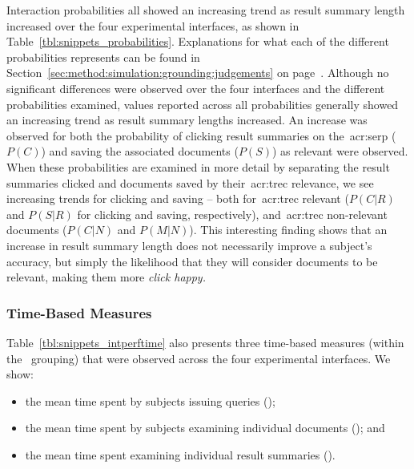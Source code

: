 Interaction probabilities all showed an increasing trend as result summary length increased over the four experimental interfaces, as shown in Table~\ref{tbl:snippets_probabilities}. Explanations for what each of the different probabilities represents can be found in Section~\ref{sec:method:simulation:grounding:judgements} on page~\pageref{sec:method:simulation:grounding:judgements}. Although no significant differences were observed over the four interfaces and the different probabilities examined, values reported across all probabilities generally showed an increasing trend as result summary lengths increased. An increase was observed for both the probability of clicking result summaries on the~\gls{acr:serp} ($P(C)$) and saving the associated documents ($P(S)$) as relevant were observed. When these probabilities are examined in more detail by separating the result summaries clicked and documents saved by their~\gls{acr:trec} relevance, we see increasing trends for clicking and saving -- both for~\gls{acr:trec} relevant ($P(C|R)$ and $P(S|R)$ for clicking and saving, respectively), and~\gls{acr:trec} non-relevant documents ($P(C|N)$ and $P(M|N)$). This interesting finding shows that an increase in result summary length does not necessarily improve a subject's accuracy, but simply the likelihood that they will consider documents to be relevant, making them more \emph{click happy.}


\subsubsection{Time-Based Measures}\label{chap:snippets:user:results:time}
Table~\ref{tbl:snippets_intperftime} also presents three time-based measures (within the ~grouping) that were observed across the four experimental interfaces. We show:

\begin{itemize}
    \item{the mean time spent by subjects issuing queries ();}
    \item{the mean time spent by subjects examining individual documents (); and}
    \item{the mean time spent examining individual result summaries ().}
\end{itemize}

